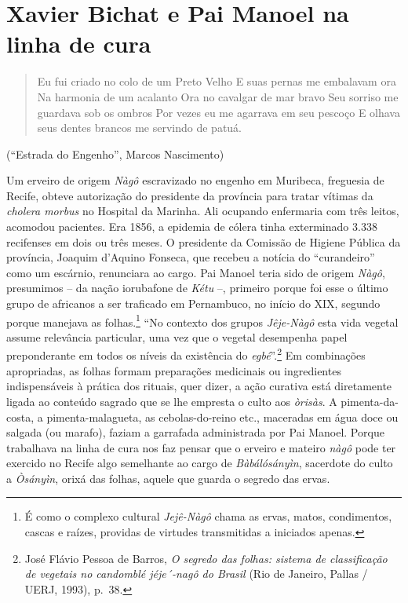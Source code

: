 \hypertarget{xavier-bichat-e-pai-manoel-na-linha-de-cura}{%
\chapter{Xavier Bichat e Pai Manoel na linha de
cura}\label{xavier-bichat-e-pai-manoel-na-linha-de-cura}}

\begin{quote}
Eu fui criado no colo de um Preto Velho E suas pernas me embalavam ora
Na harmonia de um acalanto Ora no cavalgar de mar bravo Seu sorriso me
guardava sob os ombros Por vezes eu me agarrava em seu pescoço E olhava
seus dentes brancos me servindo de patuá.
\end{quote}

(``Estrada do Engenho'', Marcos Nascimento)

Um erveiro de origem \emph{Nàgô} escravizado no engenho em Muribeca,
freguesia de Recife, obteve autorização do presidente da província para
tratar vítimas da \emph{cholera morbus} no Hospital da Marinha. Ali
ocupando enfermaria com três leitos, acomodou pacientes. Era 1856, a
epidemia de cólera tinha exterminado 3.338 recifenses em dois ou três
meses. O presidente da Comissão de Higiene Pública da província, Joaquim
d'Aquino Fonseca, que recebeu a notícia do ``curandeiro'' como um
escárnio, renunciara ao cargo. Pai Manoel teria sido de origem
\emph{Nàgô}, presumimos -- da nação iorubafone de \emph{Kétu­} --,
primeiro porque foi esse o último grupo de africanos a ser traficado em
Pernambuco, no início do XIX, segundo porque manejava as
folhas.\footnote{É como o complexo cultural \emph{Jejê-Nàgô} chama as
  ervas, matos, condimentos, cascas e raízes, providas de virtudes
  transmitidas a iniciados apenas.} ``No contexto dos grupos
\emph{Jêje-Nàgô} esta vida vegetal assume relevância particular, uma vez
que o vegetal desempenha papel preponderante em todos os níveis da
existência do \emph{egbé}''.\footnote{José Flávio Pessoa de Barros,
  \emph{O segredo das folhas: sistema de classificação de vegetais no
  candomblé jéje´-nagô do Brasil} (Rio de Janeiro, Pallas / UERJ, 1993),
  p.~38.} Em combinações apropriadas, as folhas formam preparações
medicinais ou ingredientes indispensáveis à prática dos rituais, quer
dizer, a ação curativa está diretamente ligada ao conteúdo sagrado que
se lhe empresta o culto aos \emph{òrisàs}. A pimenta-da-costa, a
pimenta-malagueta, as cebolas-do-reino etc., maceradas em água doce ou
salgada (ou marafo), faziam a garrafada administrada por Pai Manoel.
Porque trabalhava na linha de cura nos faz pensar que o erveiro e
mateiro \emph{nàgô} pode ter exercido no Recife algo semelhante ao cargo
de \emph{Bàbálósányìn}, sacerdote do culto a \emph{Òsányìn}, orixá das
folhas, aquele que guarda o segredo das ervas.

